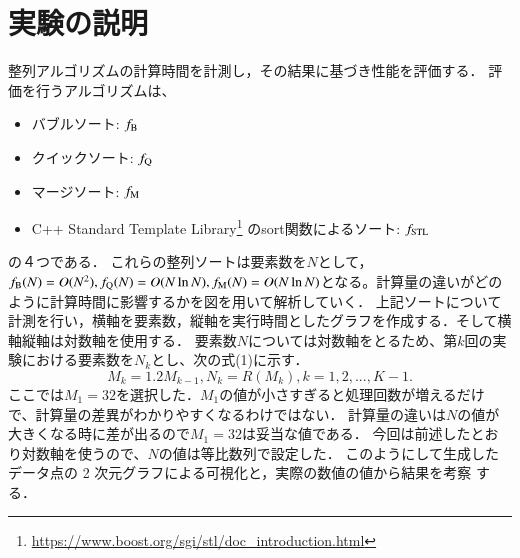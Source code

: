 \documentclass[fleqn, a4paper. 12pt]{ltjsarticle} %
\begin{document}
    \section{実験の説明}
    整列アルゴリズムの計算時間を計測し，その結果に基づき性能を評価する．
    評価を行うアルゴリズムは、
    \begin{itemize}
        \item バブルソート: $f_\mathrm{B}$
        \item クイックソート: $f_\mathrm{Q}$
        \item マージソート: $f_\mathrm{M}$
        \item C++ Standard Template Library\footnote{\url{https://www.boost.org/sgi/stl/doc_introduction.html}} のsort関数によるソート: $f_\mathrm{STL}$
    \end{itemize}
    の４つである．
    これらの整列ソートは要素数を$N$として，$f_\mathrm{B}(N) = O(N^2), f_\mathrm{Q}(N) = O(N\ln N), f_\mathrm{M}(N) = O(N\ln N)$となる。計算量の違いがどのように計算時間に影響するかを図を用いて解析していく．
    上記ソートについて計測を行い，横軸を要素数，縦軸を実行時間としたグラフを作成する．そして横軸縦軸は対数軸を使用する．
    要素数$N$については対数軸をとるため、第$k$回の実験における要素数を$N_k$とし、次の式(1)に示す．
    \begin{equation}
      \label{e3}
      M_k = 1.2M_{k-1}, N_k = R(M_k), k=1,2,...,K-1.
    \end{equation}
    ここでは$M_1 = 32$を選択した．$M_1$の値が小さすぎると処理回数が増えるだけで、計算量の差異がわかりやすくなるわけではない．
    計算量の違いは$N$の値が大きくなる時に差が出るので$M_1 = 32$は妥当な値である．
    今回は前述したとおり対数軸を使うので、$N$の値は等比数列で設定した．
    このようにして生成したデータ点の 2 次元グラフによる可視化と，実際の数値の値から結果を考察
    する．
\end{document}
